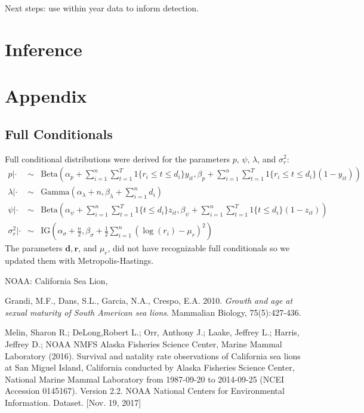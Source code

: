 \documentclass[12pt, a4paper]{article}
\begin{document}
Next steps: use within year data to inform detection.

\section{Inference}



\section{Appendix}

\subsection{Full Conditionals} 

Full conditional distributions were derived for the parameters $p$, $\psi$, $\lambda$, and $\sigma_r^2$:
\begin{eqnarray*}
p | \cdot & \sim & \text{Beta} \left( \alpha_p + \sum_{i=1}^n \sum_{t=1}^T 1 \{ r_i \leq t \leq d_i \} y_{it}, \beta_p + \sum_{i=1}^n \sum_{t=1}^T 1\{ r_i \leq t \leq d_i \} (1 - y_{it}) \right)  \\
\lambda | \cdot & \sim & \text{Gamma} \left( \alpha_{\lambda} + n, \beta_{\lambda} + \sum_{i=1}^n d_i \right) \\
\psi | \cdot & \sim & \text{Beta}\left( \alpha_{\psi} + \sum_{i=1}^n \sum_{t=1}^T 1\{ t \leq d_i\} z_{it}, \beta_{\psi} + \sum_{i=1}^n \sum_{t=1}^T 1\{ t \leq d_i \} (1 - z_{it}) \right) \\
\sigma_{r}^2 | \cdot & \sim & \text{IG} \left( \alpha_{\sigma} + \frac{n}{2}, \beta_{\sigma} + \frac{1}{2} \sum_{i=1}^n ( \log(r_i) - \mu_r)^2 \right)
\end{eqnarray*}
The parameters $\mathbf{d}, \mathbf{r}$, and $\mu_r$, did not have recognizable full conditionals so we updated them with Metropolis-Hastings.  

\begin{thebibliography}{99}

NOAA: California Sea Lion, \\

Grandi, M.F., Dans, S.L., Garcia, N.A., Crespo, E.A. 2010. \emph{Growth and age at sexual maturity of South American sea lions}. Mammalian Biology, 75(5):427-436.   

Melin, Sharon R.; DeLong,Robert L.; Orr, Anthony J.; Laake, Jeffrey L.; Harris, Jeffrey D.; NOAA NMFS Alaska Fisheries Science Center, Marine Mammal Laboratory (2016). Survival and natality rate observations of California sea lions at San Miguel Island, California conducted by Alaska Fisheries Science Center, National Marine Mammal Laboratory from 1987-09-20 to 2014-09-25 (NCEI Accession 0145167). Version 2.2. NOAA National Centers for Environmental Information. Dataset. [Nov. 19, 2017]

\end{thebibliography}
\end{document}
